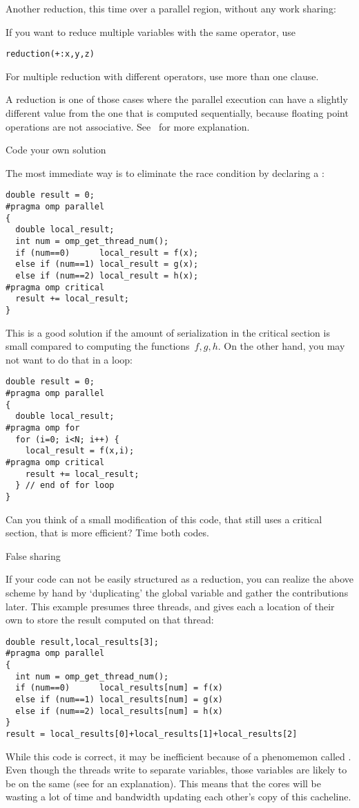 Another reduction, this time over a parallel region,
without any work sharing:
%

If you want to reduce multiple variables with the same operator, use
\begin{lstlisting}
reduction(+:x,y,z)
\end{lstlisting}
For multiple reduction with different operators, use more than one clause.

A reduction is one of those cases where the parallel execution can have a slightly different
value from the one that is computed sequentially, because floating point operations
are not associative. See~ for more explanation.

 {Code your own solution}

The most immediate way is to eliminate the race condition
by declaring a :
\begin{lstlisting}
double result = 0;
#pragma omp parallel
{
  double local_result;
  int num = omp_get_thread_num();
  if (num==0)      local_result = f(x);
  else if (num==1) local_result = g(x);
  else if (num==2) local_result = h(x);
#pragma omp critical
  result += local_result;
}
\end{lstlisting}

This is a good solution if the amount of serialization in the critical section
is small compared to computing the functions~$f,g,h$. On the other hand, you
may not want to do that in a loop:
\begin{lstlisting}
double result = 0;
#pragma omp parallel
{
  double local_result;
#pragma omp for
  for (i=0; i<N; i++) {
    local_result = f(x,i);
#pragma omp critical
    result += local_result;
  } // end of for loop
}
\end{lstlisting}
\begin{exercise}
  Can you think of a small modification of this code, that still uses a critical section,
  that is more efficient? Time both codes.
\end{exercise}

 {False sharing}

If your code can not be easily structured as a reduction, you can 
realize the above scheme by hand by
`duplicating' the global variable and gather the contributions later.
This example presumes three threads, and gives each a location of their
own to store the result computed on that thread:
\begin{lstlisting}
double result,local_results[3];
#pragma omp parallel
{
  int num = omp_get_thread_num();
  if (num==0)      local_results[num] = f(x)
  else if (num==1) local_results[num] = g(x)
  else if (num==2) local_results[num] = h(x)
}
result = local_results[0]+local_results[1]+local_results[2]
\end{lstlisting}
While this code is correct, it may be inefficient because of a
phenomemon called . Even though the threads write
to separate variables, those variables are likely to be on the same 
 (see  for an explanation).
This means that the cores will be wasting a lot of time and bandwidth updating
each other's copy of this cacheline.

